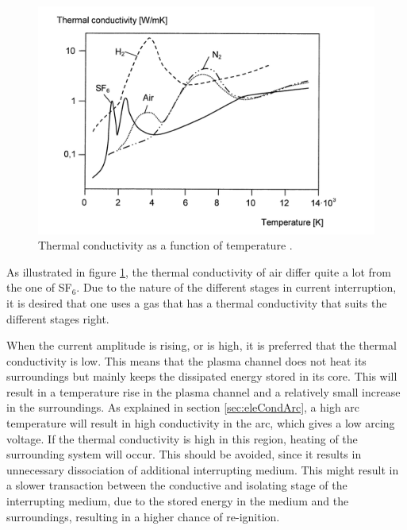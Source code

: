 \documentclass[10pt,a4paper,twoside]{article}
\begin{document}
\begin{figure}[H]
\centering
\includegraphics[scale=0.83]{Bilder/Theory/thermalCond.png}
\caption{Thermal conductivity as a function of temperature \cite{bib:HVEbreak}.} \label{fig:tempConGas}
\end{figure}

As illustrated in figure \ref{fig:tempConGas}, the thermal conductivity of air differ quite a lot from the one of SF$_6$. Due to the nature of the different stages in current interruption, it is desired that one uses a gas that has a thermal conductivity that suits the different stages right. 

When the current amplitude is rising, or is high, it is preferred that the thermal conductivity is low. This means that the plasma channel does not heat its surroundings but mainly keeps the dissipated energy stored in its core. This will result in a temperature rise in the plasma channel and a relatively small increase in the surroundings. As explained in section \ref{sec:eleCondArc}, a high arc temperature will result in high conductivity in the arc, which gives a low arcing voltage. If the thermal conductivity is high in this region, heating of the surrounding system will occur. This should be avoided, since it results in unnecessary dissociation of additional interrupting medium. This might result in a slower transaction between the conductive and isolating stage of the interrupting medium, due to the stored energy in the medium and the surroundings, resulting in a higher chance of re-ignition.
\end{document}

